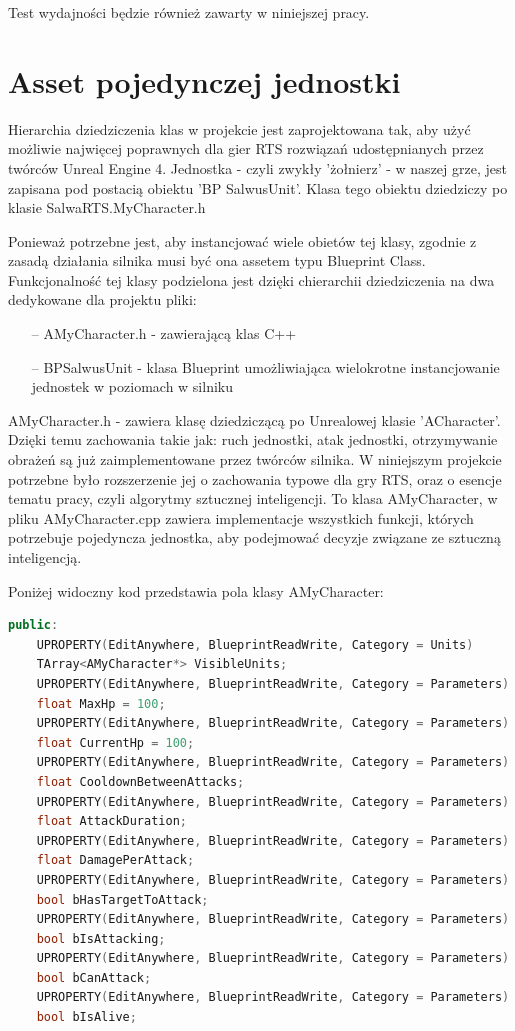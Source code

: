 \documentclass[12pt]{report}
\begin{document}
Test wydajności będzie również zawarty w niniejszej pracy.

\section{Asset pojedynczej jednostki}


Hierarchia dziedziczenia klas w projekcie jest zaprojektowana tak, aby użyć możliwie najwięcej poprawnych dla gier RTS rozwiązań udostępnianych przez twórców Unreal Engine 4. Jednostka - czyli zwykły 'żołnierz' - w naszej grze, jest zapisana pod postacią obiektu 'BP SalwusUnit'. Klasa tego obiektu dziedziczy po klasie SalwaRTS.MyCharacter.h

Ponieważ potrzebne jest, aby instancjować wiele obietów tej klasy, zgodnie z zasadą działania silnika musi być ona assetem typu Blueprint Class. Funkcjonalność tej klasy podzielona jest dzięki chierarchii dziedziczenia na dwa dedykowane dla projektu pliki: 
\begin{itemize}
\item[--] AMyCharacter.h - zawierającą klas C++
\item[--] BPSalwusUnit - klasa Blueprint umożliwiająca wielokrotne instancjowanie jednostek w poziomach w silniku
\end{itemize}

AMyCharacter.h - zawiera klasę dziedziczącą po Unrealowej klasie 'ACharacter'. Dzięki temu zachowania takie jak: ruch jednostki, atak jednostki, otrzymywanie obrażeń są już zaimplementowane przez twórców silnika. W niniejszym projekcie potrzebne było rozszerzenie jej o zachowania typowe dla gry RTS, oraz o esencje tematu pracy, czyli algorytmy sztucznej inteligencji. To klasa AMyCharacter, w pliku AMyCharacter.cpp zawiera implementacje wszystkich funkcji, których potrzebuje pojedyncza jednostka, aby podejmować decyzje związane ze sztuczną inteligencją.

Poniżej widoczny kod przedstawia pola klasy AMyCharacter:

\begin{lstlisting}[language=C++, backgroundcolor=\color{black!5}, basicstyle=\footnotesize, caption=Publiczne pola klasy AMyCharacter]
public:	
	UPROPERTY(EditAnywhere, BlueprintReadWrite, Category = Units)
	TArray<AMyCharacter*> VisibleUnits;
	UPROPERTY(EditAnywhere, BlueprintReadWrite, Category = Parameters)
	float MaxHp = 100;
	UPROPERTY(EditAnywhere, BlueprintReadWrite, Category = Parameters)
	float CurrentHp = 100;
	UPROPERTY(EditAnywhere, BlueprintReadWrite, Category = Parameters)
	float CooldownBetweenAttacks;
	UPROPERTY(EditAnywhere, BlueprintReadWrite, Category = Parameters)
	float AttackDuration;
	UPROPERTY(EditAnywhere, BlueprintReadWrite, Category = Parameters)
	float DamagePerAttack;
	UPROPERTY(EditAnywhere, BlueprintReadWrite, Category = Parameters)
	bool bHasTargetToAttack;
	UPROPERTY(EditAnywhere, BlueprintReadWrite, Category = Parameters)
	bool bIsAttacking;
	UPROPERTY(EditAnywhere, BlueprintReadWrite, Category = Parameters)
	bool bCanAttack;
	UPROPERTY(EditAnywhere, BlueprintReadWrite, Category = Parameters)
	bool bIsAlive;
\end{lstlisting}
\end{document}
